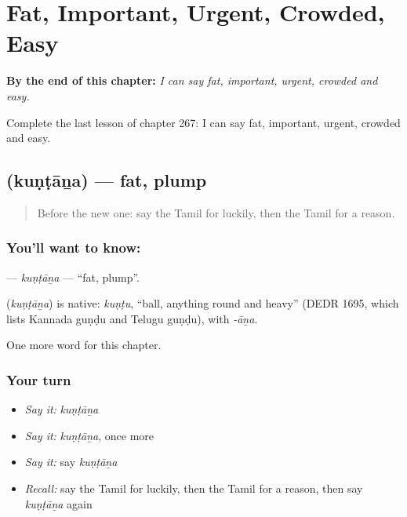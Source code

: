 
\chapter{Fat, Important, Urgent, Crowded, Easy}
\label{ch:ta-fat-important-urgent-crowded-easy}

\begin{chapteropening}
\textbf{By the end of this chapter:} \emph{I can say fat, important, urgent, crowded and easy.}

Complete the last lesson of chapter 267: I can say fat, important, urgent, crowded and easy.
\end{chapteropening}

\section[\texorpdfstring{\ta{குண்டான} (kuṇṭāṉa)}{குண்டான (kuṇṭāṉa)}]{ (kuṇṭāṉa) — fat, plump}

\label{lesson:TA-C267-kuntana}



\begin{quote}
Before the new one: say the Tamil for luckily, then the Tamil for a reason.
\end{quote}

\subsection*{You'll want to know: }
\textbf{} — \emph{kuṇṭāṉa} — \textquotedblleft{}fat, plump\textquotedblright{}.

\begin{cousinweb}
\textbf{} (\emph{kuṇṭāṉa}) is native: \emph{kuṇṭu}, \textquotedblleft{}ball, anything round and heavy\textquotedblright{} (DEDR 1695, which lists Kannada guṇḍu and Telugu guṇḍu), with \emph{-āṉa}.
\end{cousinweb}

\begin{grammarlens}[title={What you've built}]
One more word for this chapter.
\end{grammarlens}

\subsection*{Your turn}
\begin{itemize}
\raggedright
  \item \emph{Say it:} \emph{kuṇṭāṉa}
  \item \emph{Say it:} \emph{kuṇṭāṉa}, once more
  \item \emph{Say it:} say \emph{kuṇṭāṉa}
  \item \emph{Recall:} say the Tamil for luckily, then the Tamil for a reason, then say \emph{kuṇṭāṉa} again
\end{itemize}

